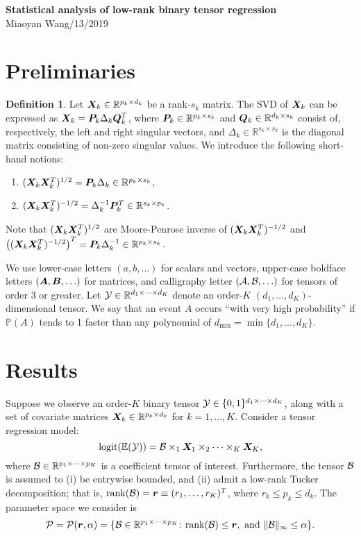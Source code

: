 \documentclass[11pt]{article}
\theoremstyle{plain}
\theoremstyle{definition}
\newtheorem{defn}{Definition}
\begin{document}
\begin{center}
{\bf \large Statistical analysis of low-rank binary tensor regression}\\
Miaoyan Wang/13/2019
\end{center}

\section{Preliminaries}
\begin{defn}\label{eq:defn}
Let $\bm X_k\in\mathbb{R}^{p_k\times d_k}$ be a rank-$s_k$ matrix. The SVD of $\bm X_k$ can be expressed as $\bm X_k=\bm{P}_k\Delta_k \bm{Q}^T_k$, where $\bm{P}_k\in\mathbb{R}^{p_k\times s_k}$ and $\bm{Q}_k\in\mathbb{R}^{d_k\times s_k}$ consist of, respectively, the left and right singular vectors, and $\Delta_k\in\mathbb{R}^{s_k\times s_k}$ is the diagonal matrix consisting of non-zero singular values. We introduce the following short-hand notions:
\begin{enumerate}
\item $(\bm X_k\bm X^T_k)^{1/2}=\bm{P}_k\Delta_k\in\mathbb{R}^{p_k\times s_k}$,
\item $(\bm X_k\bm X^T_k)^{-1/2}=\Delta^{-1}_k\bm{P}^T_k\in\mathbb{R}^{s_k\times p_k}$.
\end{enumerate}

Note that $(\bm X_k\bm X^T_k)^{1/2}$ are  Moore-Penrose inverse of $(\bm X_k\bm X^T_k)^{-1/2}$ and $\left((\bm X_k\bm X^T_k)^{-1/2}\right)^T=\bm{P}_k\Delta^{-1}_k\in\mathbb{R}^{p_k\times s_k}$.
\end{defn}

We use lower-case letters $(a, b, \ldots)$ for scalars and vectors, upper-case boldface letters $(\bm A, \bm B, \ldots)$ for matrices, and calligraphy letter $(\mathcal{A},\mathcal{B},\ldots)$ for tensors of order 3 or greater. Let $\mathcal{Y} \in \mathbb{R}^{d_1\times \cdots \times d_K}$ denote an order-$K$ $(d_1,\ldots,d_K)$-dimensional tensor. We say that an event $A$ occurs ``with very high probability'' if $\mathbb{P}(A)$ tends to 1 faster than any polynomial of $d_{\min}=\min\{d_1, . . . , d_K\}$.



\section{Results}
Suppose we observe an order-$K$ binary tensor $\mathcal{Y}\in\{0,1\}^{d_1\times \cdots \times d_K}$, along with a set of covariate matrices $\bm X_k\in\mathbb{R}^{p_k\times d_k}$ for $k=1,\ldots,K$. Consider a tensor regression model:
\begin{equation}\label{eq:model}
\text{logit}(\mathbb{E}(\mathcal{Y}))=\mathcal{B}\times_1\bm X_1\times_2\cdots\times_K \bm X_K,
\end{equation}
where $\mathcal{B}\in \mathbb{R}^{p_1\times \cdots \times p_K}$ is a coefficient tensor of interest. Furthermore, the tensor $\mathcal{B}$ is assumed to (i) be entrywise bounded,  and (ii) admit a low-rank Tucker decomposition; that is, $\text{rank}(\mathcal{B})=\bm{r}\equiv(r_1,\ldots,r_K)^T$, where $r_k\leq p_k\leq d_k$. The parameter space we consider is
\[
\mathcal{P}=\mathcal{P}(\bm{r},\alpha)=\{ \mathcal{B} \in \mathbb{R}^{p_1\times \cdots \times p_K}\colon \text{rank}(\mathcal{B})\leq \bm{r}, \ \text{and} \ \lVert\mathcal{B}\rVert_\infty\leq \alpha\}.
\]
\end{document}
